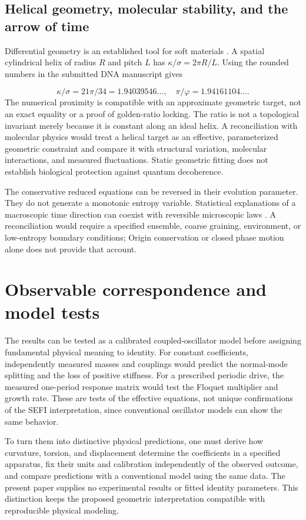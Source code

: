 \documentclass[aip,adv,preprint,floatfix]{revtex4-2}
\begin{document}
\subsection*{Helical geometry, molecular stability, and the arrow of time}
Differential geometry is an established tool for soft materials \cite{r17}. A spatial cylindrical helix of radius $R$ and pitch $L$ has $\kappa/\sigma=2\pi R/L$. Using the rounded numbers in the submitted DNA manuscript \cite{r7} gives

\begin{equation}
\kappa/\sigma=21\pi/34=1.94039546\ldots,\quad \pi/\varphi=1.94161104\ldots.
\end{equation}
The numerical proximity is compatible with an approximate geometric target, not an exact equality or a proof of golden-ratio locking. The ratio is not a topological invariant merely because it is constant along an ideal helix. A reconciliation with molecular physics would treat a helical target as an effective, parameterized geometric constraint and compare it with structural variation, molecular interactions, and measured fluctuations. Static geometric fitting does not establish biological protection against quantum decoherence.

The conservative reduced equations can be reversed in their evolution parameter. They do not generate a monotonic entropy variable. Statistical explanations of a macroscopic time direction can coexist with reversible microscopic laws \cite{r18}. A reconciliation would require a specified ensemble, coarse graining, environment, or low-entropy boundary conditions; Origin conservation or closed phase motion alone does not provide that account.

\section{Observable correspondence and model tests}
The results can be tested as a calibrated coupled-oscillator model before assigning fundamental physical meaning to identity. For constant coefficients, independently measured masses and couplings would predict the normal-mode splitting and the loss of positive stiffness. For a prescribed periodic drive, the measured one-period response matrix would test the Floquet multiplier and growth rate. These are tests of the effective equations, not unique confirmations of the SEFI interpretation, since conventional oscillator models can show the same behavior.

To turn them into distinctive physical predictions, one must derive how curvature, torsion, and displacement determine the coefficients in a specified apparatus, fix their units and calibration independently of the observed outcome, and compare predictions with a conventional model using the same data. The present paper supplies no experimental results or fitted identity parameters. This distinction keeps the proposed geometric interpretation compatible with reproducible physical modeling.
\end{document}
